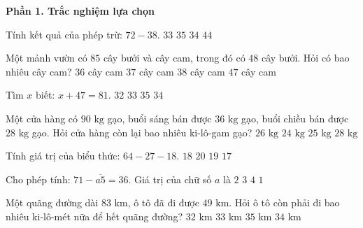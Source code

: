\textbf{Phần 1. Trắc nghiệm lựa chọn}

\begin{ex} %
Tính kết quả của phép trừ: $72 - 38$.
\choice
{$33$}
{$35$}
{\True $34$}
{$44$}
\end{ex}

\begin{ex} %
Một mảnh vườn có $85$ cây bưởi và cây cam, trong đó có $48$ cây bưởi. Hỏi có bao nhiêu cây cam?
\choice
{$36$ cây cam}
{\True $37$ cây cam}
{$38$ cây cam}
{$47$ cây cam}
\end{ex}

\begin{ex} %
Tìm $x$ biết: $x + 47 = 81$.
\choice
{$32$}
{$33$}
{$35$}
{\True $34$}
\end{ex}

\begin{ex} %
Một cửa hàng có $90\text{ kg}$ gạo, buổi sáng bán được $36\text{ kg}$ gạo, buổi chiều bán được $28\text{ kg}$ gạo. Hỏi cửa hàng còn lại bao nhiêu ki-lô-gam gạo?
\choice
{\True $26\text{ kg}$}
{$24\text{ kg}$}
{$25\text{ kg}$}
{$28\text{ kg}$}
\end{ex}

\begin{ex} %
Tính giá trị của biểu thức: $64 - 27 - 18$.
\choice
{$18$}
{$20$}
{\True $19$}
{$17$}
\end{ex}

\begin{ex} %
Cho phép tính: $71 - \overline{a5} = 36$. Giá trị của chữ số $a$ là
\choice
{$2$}
{\True $3$}
{$4$}
{$1$}
\end{ex}

\begin{ex} %
Một quãng đường dài $83\text{ km}$, ô tô đã đi được $49\text{ km}$. Hỏi ô tô còn phải đi bao nhiêu ki-lô-mét nữa để hết quãng đường?
\choice
{$32\text{ km}$}
{$33\text{ km}$}
{$35\text{ km}$}
{\True $34\text{ km}$}
\end{ex}

